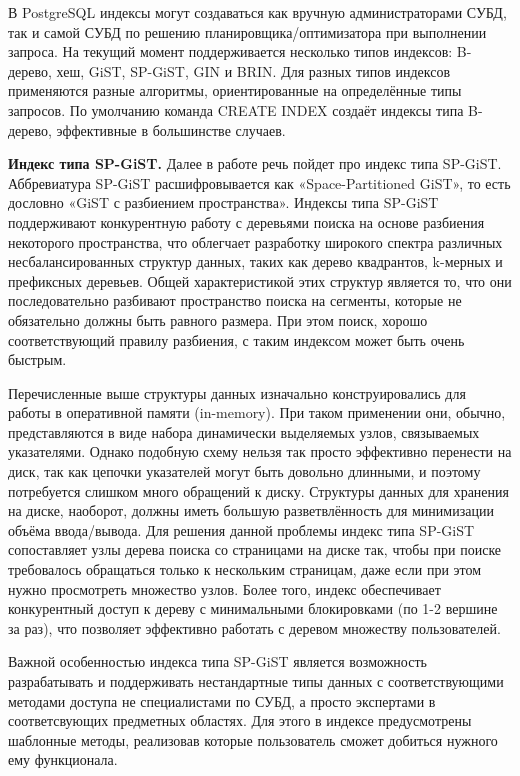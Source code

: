 \documentclass[12pt,oneside]{amsart}
\begin{document}
В PostgreSQL индексы могут создаваться как вручную администраторами СУБД, так и самой СУБД по решению планировщика/оптимизатора при выполнении запроса. На текущий момент поддерживается несколько типов индексов: B-дерево, хеш, GiST, SP-GiST, GIN и BRIN. Для разных типов индексов применяются разные алгоритмы, ориентированные на определённые типы запросов. По умолчанию команда CREATE INDEX создаёт индексы типа B-дерево, эффективные в большинстве случаев.

\textbf{Индекс типа SP-GiST.} Далее в работе речь пойдет про индекс типа SP-GiST. Аббревиатура SP-GiST расшифровывается как «Space-Partitioned GiST», то есть дословно «GiST с разбиением пространства». Индексы типа SP-GiST поддерживают конкурентную работу с деревьями поиска на основе разбиения некоторого пространства, что облегчает разработку широкого спектра различных несбалансированных структур данных, таких как дерево квадрантов, k-мерных и префиксных деревьев. Общей характеристикой этих структур является то, что они последовательно разбивают пространство поиска на сегменты, которые не обязательно должны быть равного размера. При этом поиск, хорошо соответствующий правилу разбиения, с таким индексом может быть очень быстрым.

Перечисленные выше структуры данных изначально конструировались для работы в оперативной памяти (in-memory). При таком применении они, обычно, представляются в виде набора динамически выделяемых узлов, связываемых указателями. Однако подобную схему нельзя так просто эффективно перенести на диск, так как цепочки указателей могут быть довольно длинными, и поэтому потребуется слишком много обращений к диску. Структуры данных для хранения на диске, наоборот, должны иметь большую разветвлённость для минимизации объёма ввода/вывода. Для решения данной проблемы индекс типа SP-GiST сопоставляет узлы дерева поиска со страницами на диске так, чтобы при поиске требовалось обращаться только к нескольким страницам, даже если при этом нужно просмотреть множество узлов. Более того, индекс обеспечивает конкурентный доступ к дереву с минимальными блокировками (по 1-2 вершине за раз), что позволяет эффективно работать с деревом множеству пользователей.

Важной особенностью индекса типа SP-GiST является возможность разрабатывать и поддерживать нестандартные типы данных с соответствующими методами доступа не специалистами по СУБД, а просто экспертами в соответсвующих предметных областях. Для этого в индексе предусмотрены шаблонные методы, реализовав которые пользователь сможет добиться нужного ему функционала.
\end{document}
